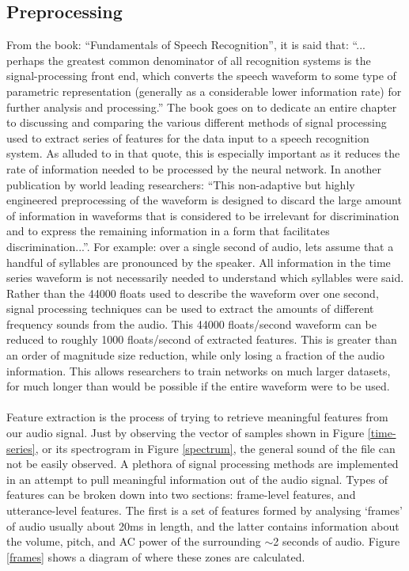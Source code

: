 \documentclass[a4paper,11pt,notitlepage]{article}
\begin{document}
\subsection{Preprocessing}


From the book: ``Fundamentals of Speech Recognition'', it is said that: ``... perhaps the greatest common denominator of all recognition systems is the signal-processing front end, which converts the speech waveform to some type of parametric representation (generally as a considerable lower information rate) for further analysis and processing.''\cite{rabiner1993fundamentals} The book goes on to dedicate an entire chapter to discussing and comparing the various different methods of signal processing used to extract series of features for the data input to a speech recognition system. As alluded to in that quote, this is especially important as it reduces the rate of information needed to be processed by the neural network. In another publication by world leading researchers: ``This non-adaptive but highly engineered preprocessing of the waveform is designed to discard the large amount of information in waveforms that is considered to be irrelevant for discrimination and to express the remaining information in a form that facilitates discrimination...''.\cite{hinton2012deep} For example: over a single second of audio, lets assume that a handful of syllables are pronounced by the speaker. All information in the time series waveform is not necessarily needed to understand which syllables were said. Rather than the 44000 floats used to describe the waveform over one second, signal processing techniques can be used to extract the amounts of different frequency sounds from the audio. This 44000 floats/second waveform can be reduced to roughly 1000 floats/second of extracted features. This is greater than an order of magnitude size reduction, while only losing a fraction of the audio information. This allows researchers to train networks on much larger datasets, for much longer than would be possible if the entire waveform were to be used.\\
\\
Feature extraction is the process of trying to retrieve meaningful features from our audio signal. Just by observing the vector of samples shown in Figure \ref{time-series}, or its spectrogram in Figure \ref{spectrum}, the general sound of the file can not be easily observed. A plethora of signal processing methods are implemented in an attempt to pull meaningful information out of the audio signal. Types of features can be broken down into two sections: frame-level features, and utterance-level features. The first is a set of features formed by analysing `frames' of audio usually about 20ms in length, and the latter contains information about the volume, pitch, and AC power of the surrounding $\sim$2 seconds of audio.\cite{truong2007automatic} Figure \ref{frames} shows a diagram of where these zones are calculated.
\end{document}
